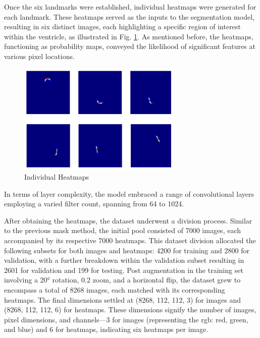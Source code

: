 \documentclass[runningheads]{llncs}
\begin{document}
Once the six landmarks were established, individual heatmaps were generated for each landmark. These heatmaps served as the inputs to the segmentation model, resulting in six distinct images, each highlighting a specific region of interest within the ventricle, as illustrated in Fig. \ref{fig:hm}. As mentioned before, the heatmaps, functioning as probability maps, conveyed the likelihood of significant features at various pixel locations.

\begin{figure}[H]
    \centering
    \includegraphics[width=0.7\textwidth]{hm.jpg}
    \caption{Individual Heatmaps}
    \label{fig:hm}
\end{figure}

In terms of layer complexity, the model embraced a range of convolutional layers employing a varied filter count, spanning from 64 to 1024.

After obtaining the heatmaps, the dataset underwent a division process. Similar to the previous mask method, the initial pool consisted of 7000 images, each accompanied by its respective 7000 heatmaps. This dataset division allocated the following subsets for both images and heatmaps: 4200 for training and 2800 for validation, with a further breakdown within the validation subset resulting in 2601 for validation and 199 for testing. Post augmentation in the training set involving a 20° rotation, 0.2 zoom, and 
a horizontal flip, the dataset grew to encompass a total of 8268 images, each matched with its corresponding heatmaps. The final dimensions settled at (8268, 112, 112, 3) for images and (8268, 112, 112, 6) for heatmaps. These dimensions signify the number of images, pixel dimensions, and channels—3 for images (representing the rgb: red, green, and blue) and 6 for heatmaps, indicating six heatmaps per image.
\end{document}
